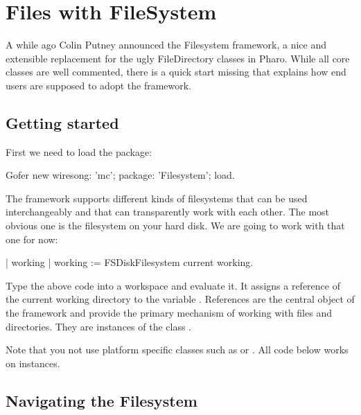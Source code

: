 \documentclass[a4paper,10pt,twoside]{book}
\begin{document}
\fi
\sloppy
\chapter{Files with FileSystem }
\chapterauthor{\authorsteph{}}

A while ago Colin Putney announced the Filesystem framework, a nice and extensible replacement for the ugly FileDirectory classes in Pharo. While all core classes are well commented, there is a quick start missing that explains how end users are supposed to adopt the framework. 

\section{Getting started}

First we need to load the package:

\begin{code}{}
 Gofer new
     wiresong: 'mc';
     package: 'Filesystem';
     load.
\end{code}     

The framework supports different kinds of filesystems that can be used interchangeably and that can transparently work with each other. The most obvious one is the filesystem on your hard disk. We are going to work with that one for now:

\begin{code}{}
| working |
working := FSDiskFilesystem current working.
\end{code} 

Type  the above code into a workspace and evaluate it. It assigns a reference of the current working directory to the variable . References are the central object of the framework and provide the primary mechanism of working with files and directories. They are instances of the class .

Note that you not use platform specific classes such as  or . All code below works on  instances.


\section{Navigating the Filesystem}
\end{document}

